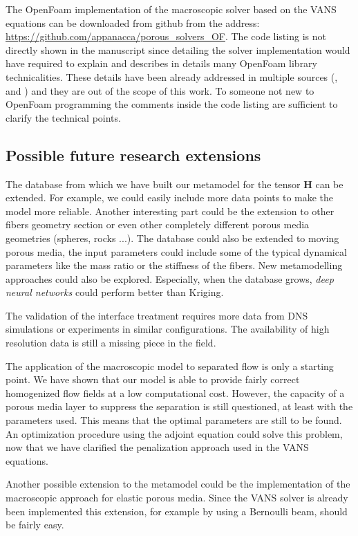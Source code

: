  The OpenFoam implementation of the macroscopic solver based on the VANS equations can be downloaded from github from the address: \url{https://github.com/appanacca/porous_solvers_OF}.
The code listing is not directly shown in the manuscript since detailing the solver implementation would have required to explain and describes in details many OpenFoam library 
technicalities. These details have been already addressed in multiple sources (\citet{jasak1996error}, \citet{moukalled2016finite} and 
\citet{maric2014openfoam}) and they are out of the scope of this work.
To someone not new to OpenFoam programming the comments inside the code listing are sufficient to clarify the technical points.




\subsection{Possible future research extensions}


 The database from which we have built our metamodel for the tensor $\mathbf{H}$ can be extended. For example, we could easily include more data points to make the model more reliable. Another interesting part could be the extension to other fibers geometry section or even other completely different porous media geometries (spheres, rocks ...). The database could also be extended to moving porous media, the input parameters could include some of the typical dynamical parameters like the mass ratio or the stiffness of the fibers. New metamodelling approaches could also be explored. Especially, when the database grows, \textit{deep neural networks} could perform better than Kriging.

 The validation of the interface treatment requires more data from DNS simulations or experiments in similar configurations. The availability of high resolution data is still a missing piece in the field.

 The application of the macroscopic model to separated flow is only a starting point. We have shown that our model is able to provide fairly correct homogenized flow fields at a low computational cost. However, the capacity of a porous media layer to suppress the separation is still questioned, at least with the parameters used. This means that the optimal parameters are still to be found. An optimization procedure using the adjoint equation could solve this problem, now that we have clarified the penalization approach used in the VANS equations.

 Another possible extension to the metamodel could be the implementation of the macroscopic approach for elastic porous media. Since the VANS solver is already been implemented this extension, for example by using a Bernoulli beam, should be fairly easy.

